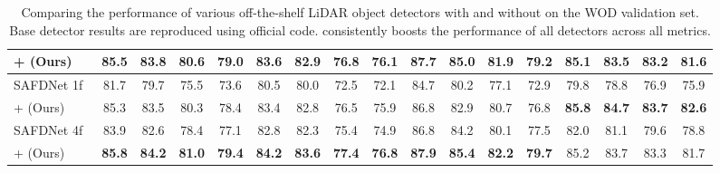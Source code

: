 \begin{table}[t]
\begin{tabular}{@{}lcccccccccccccccc@{}}
    + \ourmodel{} (Ours)               & 85.5 & 83.8 & 80.6 & 79.0 & 83.6 & 82.9 & 76.8 & 76.1 & 87.7 & 85.0 & 81.9 & 79.2 & 85.1 & 83.5 & 83.2 & 81.6 \\ \midrule
    SAFDNet 1f~\cite{safdnet}          & 81.7          & 79.7 & 75.5 & 73.6 & 80.5          & 80.0 & 72.5 & 72.1 & 84.7 & 80.2 & 77.1 & 72.9 & 79.8 & 78.8 & 76.9 & 75.9 \\
    \rowcolor{tablecolor}
    + \ourmodel{} (Ours)               & 85.3 & 83.5 & 80.3 & 78.4 & 83.4 & 82.8 & 76.5 & 75.9 & 86.8 & 82.9 & 80.7 & 76.8 & \textbf{85.8} & \textbf{84.7} & \textbf{83.7} & \textbf{82.6} \\ \midrule
    SAFDNet 4f~\cite{safdnet}          & 83.9          & 82.6 & 78.4 & 77.1 & 82.8          & 82.3 & 75.4 & 74.9 & 86.8 & 84.2 & 80.1 & 77.5 & 82.0 & 81.1 & 79.6 & 78.8 \\
    \rowcolor{tablecolor}
    + \ourmodel{} (Ours)          & \textbf{85.8} & \textbf{84.2} & \textbf{81.0} & \textbf{79.4} & \textbf{84.2} & \textbf{83.6} & \textbf{77.4} & \textbf{76.8} & \textbf{87.9} & \textbf{85.4} & \textbf{82.2} & \textbf{79.7} & 85.2 & 83.7 & 83.3 & 81.7 \\ \bottomrule
    \end{tabular}
    \caption{
        Comparing the performance of various off-the-shelf LiDAR object detectors with and without \ourmodel{} on the WOD validation set. 
        Base detector results are reproduced using official code. \ourmodel{} consistently boosts the performance of all detectors across all metrics.
    }
    \label{tab:main-table-wod}
\end{table}